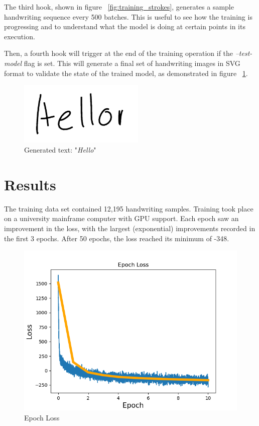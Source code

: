 \documentclass{article}
\begin{document}
The third hook, shown in figure ~\ref{fig:training_strokes}, generates a sample handwriting sequence every 500 batches. This is useful to see how the training is progressing and to understand what the model is doing at certain points in its execution.

Then, a fourth hook will trigger at the end of the training operation if the \textit{--test-model} flag is set. This will generate a final set of handwriting images in SVG format to validate the state of the trained model, as demonstrated in figure ~\ref{fig:hello}.

    \begin{figure}[hbt!]
        \includegraphics[width=6cm]{Sample}
        \centering
        \caption{Generated text: "\emph{Hello}"}
        \label{fig:hello}
    \end{figure}
    
\section{Results}
The training data set contained 12,195 handwriting samples.  Training took place on a university mainframe computer with GPU support.  Each epoch saw an improvement in the loss, with the largest (exponential) improvements recorded in the first 3 epochs.  After 50 epochs, the loss reached its minimum of -348.

    \begin{figure}[hbt!]
        \includegraphics[width=12cm]{epoch_loss}
        \centering
        \caption{Epoch Loss}
        \label{fig:loss}
    \end{figure}
    
\end{document}
